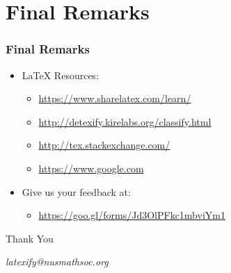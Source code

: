 \documentclass{beamer}
\begin{document}
    \section{Final Remarks}
    \begin{frame}
        \frametitle{Final Remarks}
        \begin{itemize}
            \item \LaTeX{} Resources:
            \begin{itemize}
                \item \url{https://www.sharelatex.com/learn/}
                \item \url{http://detexify.kirelabs.org/classify.html}
                \item \url{http://tex.stackexchange.com/}
                \item \url{https://www.google.com}
            \end{itemize}
            \item Give us your feedback at:
            \begin{itemize}
                \item \url{https://goo.gl/forms/Jd3OlPFkc1mbviYm1}
            \end{itemize}
        \end{itemize}
    \end{frame}

    \begin{frame}
        \Huge{\centerline{Thank You}}
        \begin{center}
            \begin{normalsize}
                \emph{latexify@nusmathsoc.org}
            \end{normalsize}
        \end{center}
    \end{frame}
\end{document}
